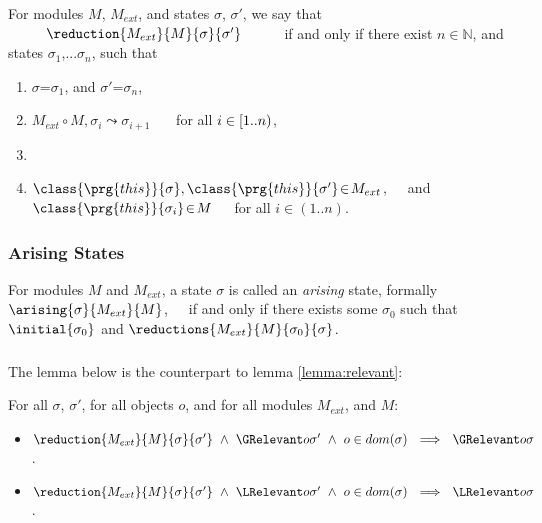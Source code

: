 \begin{definition}
\label{def:pair-reduce}
For    modules $M$,  $M_{ext}$, and     states $\sigma$, $\sigma'$, 
we say that $\ \ \ \ \ \ \ \ \reduction{M_{ext}}{M}{\sigma}{\sigma'}\ \ \ \ \ \ \ \ $ if and only if there exist 
$n\in\mathbb{N}$, and states $\sigma_1$,...$\sigma_n$, such that
\begin{enumerate}
\item
\label{vis1}
$\sigma$=$\sigma_1$, and  $\sigma'$=$\sigma_n$,
\item
\label{vis2}
$M_{ext} \circ M, \sigma_i \leadsto \sigma_{i+1}$  \ \ \ for all $i\in [1..n)$,
\item
\label{vis3}
\item
\label{vis4}
$\class {\prg{this}}{\sigma}, \class {\prg{this}} {\sigma'}\!\in\! M_{ext}$,\ \ \ and \ \ \
$\class {\prg{this}} {\sigma_i}\!\in\! M$\ \ \ for all $i\!\in\! (1..n)$.
\end{enumerate} 
\end{definition}
 
 
\subsubsection{Arising States}

\begin{definition}
\label{def:arising}
For   modules $M$ and  $M_{ext}$, a %
 state $\sigma$ is 
called an \emph{arising} state, formally \ \ \ $\arising{\sigma}{M_{ext}}{M}$,\ \ \ 
if and only if there exists some $\sigma_0$ such that $\initial{\sigma_0}$ and
$\reductions{M_{ext}}{M}{\sigma_0}{\sigma}$.
\end{definition}


 
\subsubsection{}


The lemma below is the counterpart to lemma \ref{lemma:relevant}:

\begin{lemma}
For all $\sigma$, $\sigma'$, for all objects $o$, and for all modules $M_{ext}$, and $M$:
\begin{itemize}
\item
$\reduction {M_{ext}} {M} {\sigma} {\sigma'} \ \wedge \  \GRelevant o {\sigma'} \ \wedge \ o\in dom(\sigma) \ \ \Longrightarrow \ \  \GRelevant o {\sigma}$.
\item
$\reduction {M_{ext}} {M} {\sigma} {\sigma'} \ \wedge \    \LRelevant o {\sigma'}\   \wedge \ o\in dom(\sigma) \ \ \Longrightarrow \ \  \LRelevant o {\sigma}$.
\end{itemize}
\end{lemma}
 

